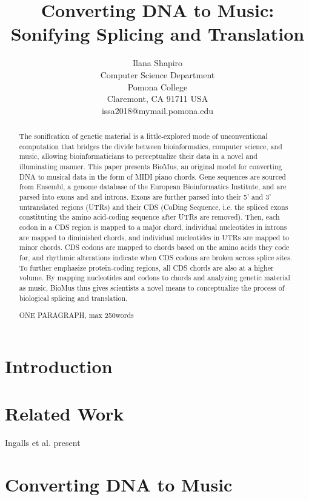 \documentclass[letterpaper]{article}
\title{Converting DNA to Music: Sonifying Splicing and Translation}
\author{Ilana Shapiro\\
Computer Science Department\\
Pomona College\\
Claremont, CA 91711 USA\\
issa2018@mymail.pomona.edu\\
}
\begin{document}
 
\maketitle
\begin{abstract}
The sonification of genetic material is a little-explored mode of unconventional computation that bridges the divide between bioinformatics, computer science, and music, allowing bioinformaticians to perceptualize their data in a novel and illuminating manner. This paper presents BioMus, an original model for converting DNA to musical data in the form of MIDI piano chords. Gene sequences are sourced from Ensembl, a genome database of the European Bioinformatics Institute, and are parsed into exons and and introns. Exons are further parsed into their 5' and 3' untranslated regions (UTRs) and their CDS (CoDing Sequence, i.e. the spliced exons constituting the amino acid-coding sequence after UTRs are removed). Then, each codon in a CDS region is mapped to a major chord, individual nucleotides in introns are mapped to diminished chords, and individual nucleotides in UTRs are mapped to minor chords. CDS codons are mapped to chords based on the amino acids they code for, and rhythmic alterations indicate when CDS codons are broken across splice sites. To further emphasize protein-coding regions, all CDS chords are also at a higher volume. By mapping nucleotides and codons to chords and analyzing genetic material as music, BioMus thus gives scientists a novel means to conceptualize the process of biological splicing and translation.

ONE PARAGRAPH, max 250words
\end{abstract}

\section{Introduction}

\section{Related Work}

Ingalls et al. present 

\section{Converting DNA to Music}
\end{document}
